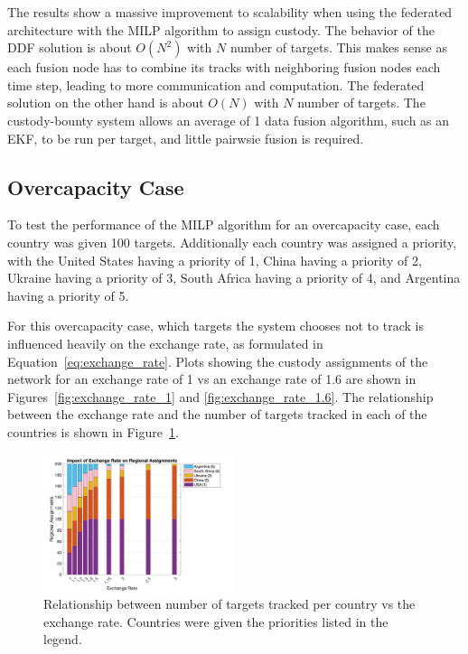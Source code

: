    The results show a massive improvement to scalability when using the federated architecture with the MILP algorithm to assign custody. 
    The behavior of the DDF solution is about $O(N^2)$ with $N$ number of targets. This makes sense as each fusion node has to combine its tracks with neighboring fusion nodes each time step, leading to more communication and computation.
    The federated solution on the other hand is about $O(N)$ with $N$ number of targets. The custody-bounty system allows an average of 1 data fusion algorithm, such as an EKF, to be run per target, and little pairwsie fusion is required.

\subsection{Overcapacity Case}


    To test the performance of the MILP algorithm for an overcapacity case, each country was given 100 targets. 
    Additionally each country was assigned a priority, with the United States having a priority of 1, China having a priority of 2, Ukraine having a priority of 3, South Africa having a priority of 4, and Argentina having a priority of 5.

    For this overcapacity case, which targets the system chooses not to track is influenced heavily on the exchange rate, as formulated in Equation~\eqref{eq:exchange_rate}.
    Plots showing the custody assignments of the network for an exchange rate of 1 vs an exchange rate of 1.6 are shown in Figures~\ref{fig:exchange_rate_1} and \ref{fig:exchange_rate_1.6}.
    The relationship between the exchange rate and the number of targets tracked in each of the countries is shown in Figure~\ref{fig:assignment_vs_exchange_rate}.

    \begin{figure}[h]
        \centering
        \includegraphics[width=0.5\textwidth]{figs/assignment_vs_exchange_rate.png}
        \caption{Relationship between number of targets tracked per country vs the exchange rate. Countries were given the priorities listed in the legend.}
        \label{fig:assignment_vs_exchange_rate}
    \end{figure}

